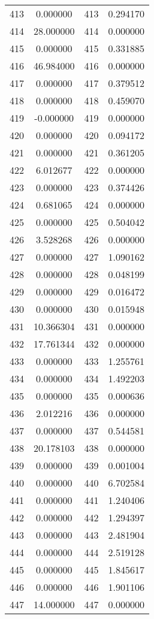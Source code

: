 \documentclass[12pt]{article}
\begin{document}
\begin{longtable}{@{}cccc@{}}
413 & 0.000000 & 413 & 0.294170 \\
414 & 28.000000 & 414 & 0.000000 \\
415 & 0.000000 & 415 & 0.331885 \\
416 & 46.984000 & 416 & 0.000000 \\
417 & 0.000000 & 417 & 0.379512 \\
418 & 0.000000 & 418 & 0.459070 \\
419 & -0.000000 & 419 & 0.000000 \\
420 & 0.000000 & 420 & 0.094172 \\
421 & 0.000000 & 421 & 0.361205 \\
422 & 6.012677 & 422 & 0.000000 \\
423 & 0.000000 & 423 & 0.374426 \\
424 & 0.681065 & 424 & 0.000000 \\
425 & 0.000000 & 425 & 0.504042 \\
426 & 3.528268 & 426 & 0.000000 \\
427 & 0.000000 & 427 & 1.090162 \\
428 & 0.000000 & 428 & 0.048199 \\
429 & 0.000000 & 429 & 0.016472 \\
430 & 0.000000 & 430 & 0.015948 \\
431 & 10.366304 & 431 & 0.000000 \\
432 & 17.761344 & 432 & 0.000000 \\
433 & 0.000000 & 433 & 1.255761 \\
434 & 0.000000 & 434 & 1.492203 \\
435 & 0.000000 & 435 & 0.000636 \\
436 & 2.012216 & 436 & 0.000000 \\
437 & 0.000000 & 437 & 0.544581 \\
438 & 20.178103 & 438 & 0.000000 \\
439 & 0.000000 & 439 & 0.001004 \\
440 & 0.000000 & 440 & 6.702584 \\
441 & 0.000000 & 441 & 1.240406 \\
442 & 0.000000 & 442 & 1.294397 \\
443 & 0.000000 & 443 & 2.481904 \\
444 & 0.000000 & 444 & 2.519128 \\
445 & 0.000000 & 445 & 1.845617 \\
446 & 0.000000 & 446 & 1.901106 \\
447 & 14.000000 & 447 & 0.000000 \\

\end{longtable}
\end{document}

